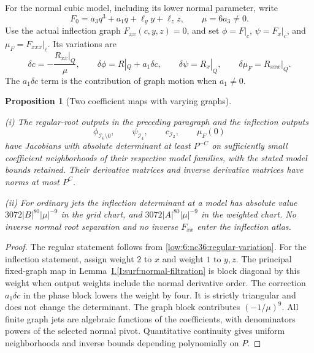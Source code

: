 \documentclass[11pt]{amsart}
\newtheorem{proposition}[theorem]{Proposition}
\theoremstyle{definition}
\theoremstyle{remark}
\numberwithin{equation}{section}
\newcommand{\partIref}[1]{\hyperref[I:#1]{I.\ref*{I:#1}}}
\begin{document}
For the normal cubic model, including its lower normal parameter, write
\[
F_0=a_3q^3+a_1q+\ell_y y+\ell_z z,\qquad \mu=6a_3\ne0.
\]
Use the actual inflection graph $F_{xx}(c,y,z)=0$, and set $\phi=F|_c$, $\psi=F_x|_c$, and $\mu_F=F_{xxx}|_c$. Its variations are
\begin{equation}\label{low:6:nc36:inflection-variation}
 \delta c=-\frac{R_{xx}|_Q}{\mu},\qquad
 \delta\phi=R|_Q+a_1\delta c,\qquad
 \delta\psi=R_x|_Q,\qquad
 \delta\mu_F=R_{xxx}|_Q.
\end{equation}
The $a_1\delta c$ term is the contribution of graph motion when $a_1\ne0$.

\begin{proposition}[Two coefficient maps with varying graphs]\label{low:6:nc36:moving-atlases}

\noindent\textup{(i)} The regular-root outputs in the preceding paragraph and the inflection outputs
\[
 \phi_{\mathcal I_6\setminus0},\qquad
 \psi_{\mathcal I_4},\qquad
c_{\mathcal I_2},\qquad
 \mu_F(0)
\]
have Jacobians with absolute determinant at least $P^{-C}$ on sufficiently small coefficient neighborhoods of their respective model families, with the stated model bounds retained. Their derivative matrices and inverse derivative matrices have norms at most $P^C$.

\noindent\textup{(ii)} For ordinary jets the inflection determinant at a model has absolute value $3072|B|^{80}|\mu|^{-9}$ in the grid chart, and $3072|A|^{80}|\mu|^{-9}$ in the weighted chart. No inverse normal root separation and no inverse $F_{xx}$ enter the inflection atlas.
\end{proposition}
\begin{proof}
The regular statement follows from \eqref{low:6:nc36:regular-variation}. For the inflection statement, assign weight $2$ to $x$ and weight $1$ to $y,z$. The principal fixed-graph map in Lemma~\partIref{surf:normal-filtration} is block diagonal by this weight when output weights include the normal derivative order. The correction $a_1\delta c$ in the phase block lowers the weight by four. It is strictly triangular and does not change the determinant. The graph block contributes $(-1/\mu)^9$. All finite graph jets are algebraic functions of the coefficients, with denominators powers of the selected normal pivot. Quantitative continuity gives uniform neighborhoods and inverse bounds depending polynomially on $P$.
\end{proof}
\end{document}
